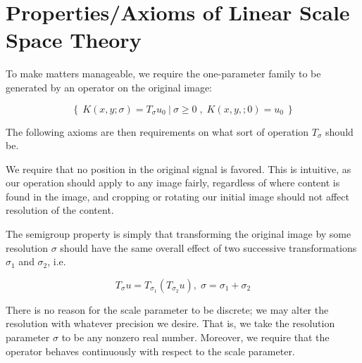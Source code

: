     \section{Properties/Axioms of Linear Scale Space Theory}
	 To make matters manageable, we require the one-parameter family to be generated by an operator on the original image:
	 
	\begin{equation}
		\left\{\ K(x,y;\sigma) = T_\sigma u_0
		\ \lvert \ 
		\sigma \ge 0
		\; ,\; K(x,y,;0) = u_0
		\ \right\} 
	\end{equation}
    
	The following axioms are then requirements on what sort of operation $T_\sigma$ should be.
		
    \begin{axiom}
    	\label{axiom:linear-shift-and-rotation}
    We require that no position in the original signal is favored.  This is intuitive, as our operation should apply to any image fairly, regardless of where content is found in the image, and cropping or rotating our initial image should not affect resolution of the content.
\end{axiom}
   
     \begin{axiom} \label{axiom:semigroup}
   	The semigroup property is simply that transforming
   	the original image by some resolution $\sigma$ should
   	have the same overall effect of two successive
   	transformations $\sigma_1$ and $\sigma_2$, i.e.
   	
   	\begin{equation}	
   	T_{\sigma} u = T_{\sigma_1} \left(T_{\sigma_2} u\right) ,\; \sigma = \sigma_1 + \sigma_2
   	\end{equation}
   \end{axiom}
 
    \begin{axiom}
    	\label{axiom:continuity} There is no reason for the scale parameter to be discrete; we may alter the resolution with whatever precision we desire. That is, we take the resolution
    parameter $\sigma$ to be any nonzero real number. Moreover, we require that the operator behaves continuously with respect to the scale parameter.
        \end{axiom}
    
	
